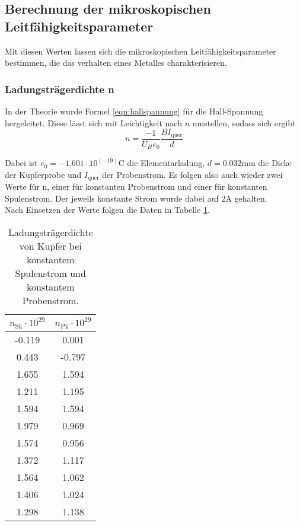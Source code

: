 \noindent 

\subsection{Berechnung der mikroskopischen Leitfähigkeitsparameter}

Mit diesen Werten lassen sich die mikroskopischen Leitfähigkeitsparameter bestimmen, die das verhalten eines Metalles charakterisieren.

\subsubsection{Ladungsträgerdichte n}
In der Theorie wurde Formel \eqref{eqn:hallspannung} für die Hall-Spannung hergeleitet.
Diese lässt sich mit Leichtigkeit nach $n$ umstellen, sodass sich ergibt
\begin{equation*}
n = \frac{-1}{U_H e_0} \frac{B I_\text{quer}}{d}
\end{equation*}

Dabei ist $e_0 = -1.601 \cdot 10^(-19)\si{\coulomb}$ die Elementarladung, $d = 0.032 \si{\milli\meter}$ die Dicke der Kupferprobe
und $I_\text{quer}$ der Probenstrom.
Es folgen also auch wieder zwei Werte für n, einer für konstanten Probenstrom und einer für
konstanten Spulenstrom. Der jeweils konstante Strom wurde dabei auf $2 \si{\ampere}$ gehalten.\\
Nach Einsetzen der Werte folgen die Daten in Tabelle \ref{tab:nnn}.

\begin{table}
 \centering
 \label{tab:nnn}
 \caption{Ladungsträgerdichte von Kupfer bei konstantem Spulenstrom und konstantem Probenstrom.}
 \begin{tabular}{c c}
  \toprule
  $n_\text{Sk} \cdot 10^{29}$ & $n_\text{Pk} \cdot 10^{29}$ \\
  \midrule
   -0.119& 0.001\\
   0.443 & -0.797\\  
   1.655 & 1.594\\
   1.211 & 1.195\\
   1.594 & 1.594\\
   1.979 & 0.969\\
   1.574 & 0.956\\
   1.372 & 1.117\\       
   1.564 & 1.062\\
   1.406 & 1.024\\
   1.298 & 1.138\\   
  \bottomrule
 \end{tabular}
\end{table} 

